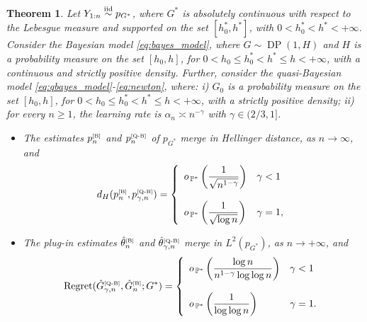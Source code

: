 \documentclass[twoside,12pt]{article}
\def\simiid{\stackrel{\mbox{\scriptsize{iid}}}{\sim}}
\newtheorem{thm}{Theorem}[section]
\begin{document}
\begin{thm}\label{merge_1d}
Let $Y_{1:n}\simiid p_{G^\ast}$, where $G^\ast$ is absolutely continuous with respect to the Lebesgue measure and supported on the set $[h_0^\ast,h^\ast]$, with $0<h_0^\ast<h^\ast<+\infty$. Consider the Bayesian model \eqref{eq:bayes_model}, where $G\sim \operatorname{DP}(1,H)$ and $H$ is a probability measure on the set $[h_{0},h]$, for $0<h_{0}\leq h_{0}^{\ast}<h^{\ast}\leq h<+\infty$, with a continuous and strictly positive density. Further, consider the quasi-Bayesian model \eqref{eq:qbayes_model}-\eqref{eq:newton}, where: i) $G_0$ is a probability measure on the set $[h_0,h]$, for $0<h_0\leq h_0^\ast<h^\ast\leq h<+\infty$, with a strictly positive density; ii)  for every $n\geq 1$, the learning rate is $\alpha_n\asymp n^{-\gamma}$ with $\gamma\in(2/3,1]$. %
\begin{itemize}
    \item[a)] The estimates  $p_{n}^{\text{\tiny{[B]}}}$ and $p_{n}^{\text{\tiny{[Q-B]}}}$ of $p_{G^\ast}$ merge in Hellinger distance, as $n\rightarrow\infty$, and
    \begin{displaymath}
d_H(p_{n}^{\text{\tiny{[B]}}},p_{\gamma,n}^{\text{\tiny{[Q-B]}}})=\left\{
\begin{array}{ll}
o_{\,\mathbb{P}^{\ast}}\left(\dfrac {1}{\sqrt{n^{1-\gamma}}}\right)&\gamma<1\\
\\
o_{\,\mathbb{P}^{\ast}}\left(\dfrac{1}{\sqrt{\log n}}\right)&\gamma=1,
\end{array}\right.
\end{displaymath}
\item[b)] The plug-in estimates $\hat\theta_{n}^{\text{\tiny{[B]}}}$ and $\hat\theta_{\gamma,n}^{\text{\tiny{[Q-B]}}}$ merge in $L^2(p_{G^\ast})$, as $n\rightarrow+\infty$, and
\begin{displaymath}
\mathrm{Regret}(\hat G_{\gamma,n}^{\text{\tiny{[Q-B]}}},\hat G_{n}^{\text{\tiny{[B]}}};G^{\ast})=
\left\{
\begin{array}{ll}
o_{\,\mathbb{P}^{\ast}}\left(\dfrac{\log n}{n^{1-\gamma}\log\log n}\right)&\gamma <1\\
\\
o_{\,\mathbb{P}^{\ast}}\left(\dfrac{1}{\log\log n}\right)&\gamma =1.
\end{array}
\right.
\end{displaymath}
\end{itemize}
\end{thm}
\end{document}
